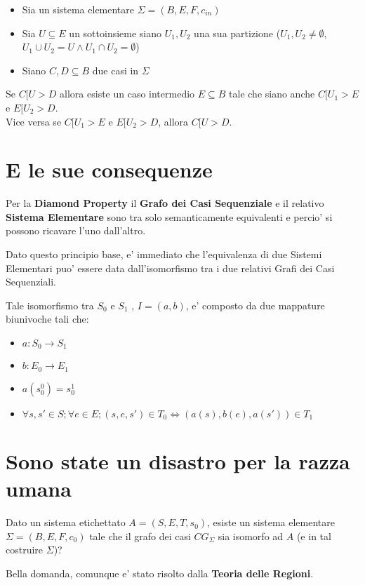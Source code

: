 \begin{itemize}
  \item Sia un sistema elementare $\Sigma = (B, E, F, c_{in})$
  \item Sia $U \subseteq E$ un sottoinsieme siano $U_1,U_2$ una sua partizione ($U_1,U_2 \neq \emptyset$, $U_1 \cup U_2 = U \land U_1 \cap U_2 = \emptyset$)
  \item Siano $C,D \subseteq B$ due casi in $\Sigma$
\end{itemize}

Se $C[U>D$ allora esiste un caso intermedio $E \subseteq B$ tale che siano anche $C[U_1>E$ e $E[U_2>D$. \\
Vice versa se $C[U_1>E$ e $E[U_2>D$, allora $C[U>D$.

\section{E le sue consequenze}

Per la \textbf{Diamond Property} il \textbf{Grafo dei Casi Sequenziale} e il relativo \textbf{Sistema Elementare} sono tra solo semanticamente equivalenti e percio' si possono ricavare l'uno dall'altro.

Dato questo principio base, e' immediato che l'equivalenza di due Sistemi Elementari puo' essere data dall'isomorfismo tra i due relativi Grafi dei Casi Sequenziali.

Tale isomorfismo tra $S_0$ e $S_1$ , $I = (a, b)$, e' composto da due mappature biunivoche tali che:
\begin{itemize}
  \item $a: S_0 \rightarrow S_1$
  \item $b : E_0 \rightarrow E_1$
  \item $a(s^0_0) = s^1_0$
  \item $\forall s,s' \in S; \forall e \in E; (s, e, s') \in T_0 \Leftrightarrow (a(s), b(e), a(s')) \in T_1$
\end{itemize}

\section{Sono state un disastro per la razza umana}

Dato un sistema etichettato $A = (S, E, T, s_0)$, esiste un sistema elementare $\Sigma = (B, E, F, c_0)$ tale che il grafo dei casi $CG_\Sigma$ sia isomorfo ad $A$ (e in tal costruire $\Sigma$)?

Bella domanda, comunque e' stato risolto dalla \textbf{Teoria delle Regioni}.

